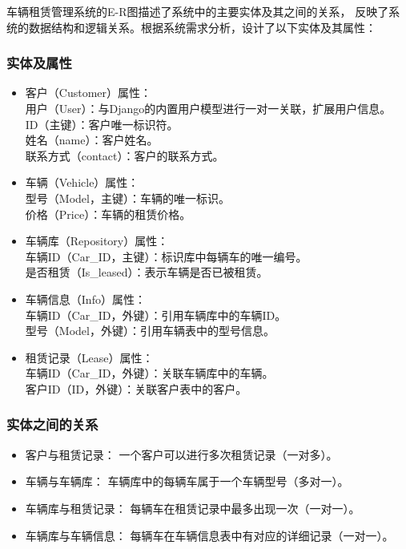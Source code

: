 \documentclass[UTF8,a4paper,12pt]{ctexart}
\begin{document}
车辆租赁管理系统的E-R图描述了系统中的主要实体及其之间的关系，
反映了系统的数据结构和逻辑关系。根据系统需求分析，设计了以下实体及其属性：

\subsubsection{实体及属性}

\begin{itemize}
    \item 客户（Customer）属性：\\
    用户（User）：与Django的内置用户模型进行一对一关联，扩展用户信息。\\
    ID（主键）：客户唯一标识符。\\
    姓名（name）：客户姓名。\\
    联系方式（contact）：客户的联系方式。\\

    \item 车辆（Vehicle）属性：\\
    型号（Model，主键）：车辆的唯一标识。\\
    价格（Price）：车辆的租赁价格。\\

    \item 车辆库（Repository）属性：\\
    车辆ID（Car\_ID，主键）：标识库中每辆车的唯一编号。\\
    是否租赁（Is\_leased）：表示车辆是否已被租赁。\\

    \item 车辆信息（Info）属性：\\
    车辆ID（Car\_ID，外键）：引用车辆库中的车辆ID。\\
    型号（Model，外键）：引用车辆表中的型号信息。\\
    
    \item 租赁记录（Lease）属性：\\
    车辆ID（Car\_ID，外键）：关联车辆库中的车辆。\\
    客户ID（ID，外键）：关联客户表中的客户。\\
\end{itemize}

\subsubsection{实体之间的关系} 
\begin{itemize}
\item 客户与租赁记录：
一个客户可以进行多次租赁记录（一对多）。

\item 车辆与车辆库：
车辆库中的每辆车属于一个车辆型号（多对一）。

\item 车辆库与租赁记录：
每辆车在租赁记录中最多出现一次（一对一）。

\item 车辆库与车辆信息：
每辆车在车辆信息表中有对应的详细记录（一对一）。
\end{itemize}
\end{document}
